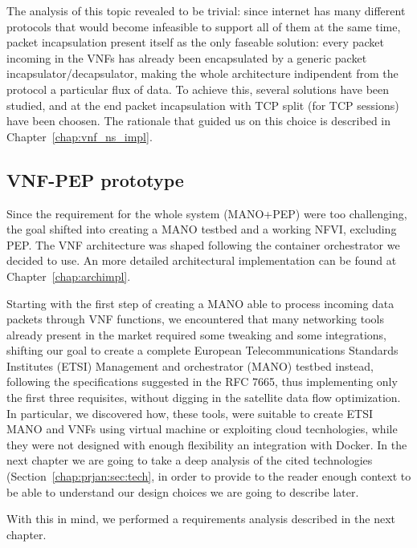 The analysis of this topic revealed to be trivial: since internet has many
different protocols that would become infeasible to support all of them at the
same time, packet incapsulation present itself as the only faseable solution:
every packet incoming in the VNFs has already been encapsulated by a generic
packet incapsulator/decapsulator,
 making the whole architecture 
indipendent from the protocol a particular flux of data. To achieve this, 
several solutions have been studied, and at the end packet incapsulation with 
TCP split (for TCP sessions) have been choosen. The rationale that guided us on 
this choice is described in Chapter~\ref{chap:vnf_ns_impl}. 

\subsection{VNF-PEP prototype}

Since the requirement for the whole system (MANO+PEP) were too challenging, the 
goal shifted into creating a MANO testbed and a working NFVI, excluding PEP. 
The VNF architecture was shaped following the container orchestrator we decided 
to use. An more detailed architectural implementation can be found at 
Chapter~\ref{chap:archimpl}.


\vspace{0.5cm}

Starting with the first step of creating a MANO able to process incoming data
packets through VNF functions, we encountered that many networking tools already
present in the market required some tweaking and some integrations, shifting our
goal to create a complete European Telecommunications Standards Institutes
(ETSI) Management and orchestrator (MANO) testbed instead, following the
specifications suggested in the RFC 7665, thus implementing only the first three
requisites, without digging in the satellite data flow optimization. In
particular, we discovered how, these tools, were suitable to create ETSI MANO
and VNFs using virtual machine or exploiting cloud tecnhologies, while they were
not designed with enough flexibility an integration with Docker. In the next
chapter we are going to take a deep analysis of the cited technologies 
(Section~\ref{chap:prjan:sec:tech}, in order to provide to the reader enough 
context to be able to understand our design choices we are going to describe 
later.

\noindent With this in mind, we performed a requirements analysis described in
the next chapter.
 
